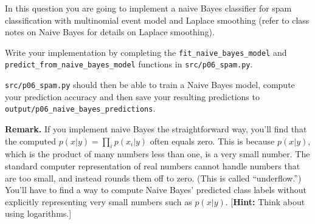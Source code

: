 \item {}
In this question you are going to implement a naive Bayes classifier for spam
classification with multinomial event model and Laplace smoothing (refer to
class notes on Naive
Bayes for details on Laplace smoothing).

Write your implementation by completing the \texttt{fit\_naive\_bayes\_model}
and \\\texttt{predict\_from\_naive\_bayes\_model} functions in
\texttt{src/p06\_spam.py}.

\texttt{src/p06\_spam.py} should then be able to train a Naive Bayes model,
compute your prediction accuracy and then save your resulting predictions
to \texttt{output/p06\_naive\_bayes\_predictions}.

{\bf Remark.} If you implement naive Bayes the straightforward way, you'll find
that the computed $p(x|y) = \prod_i p(x_i | y)$ often equals zero.  This is
because $p(x|y)$, which is the product of many numbers less than one, is a very
small  number. The standard computer representation of real numbers cannot
handle numbers that are too small, and instead rounds them off to zero.  (This
is called  ``underflow.'')  You'll have to find a way to compute Naive Bayes'
predicted  class labels without explicitly representing very small numbers such
as $p(x|y)$.
[\textbf{Hint:} Think about using logarithms.]

\ifnum{} {
  
} \fi
